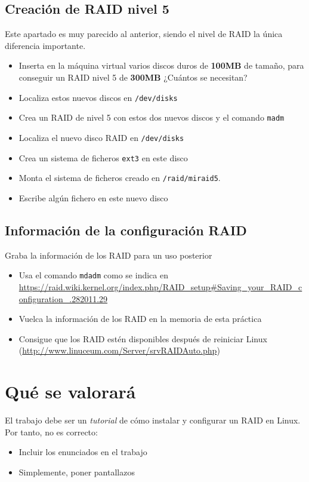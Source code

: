\subsection{Creación de RAID nivel 5}
Este apartado es muy parecido al anterior, siendo el nivel de RAID la única diferencia importante.
\begin{itemize}
\item Inserta en la máquina virtual varios discos duros de \textbf{100MB} de tamaño, para conseguir un RAID nivel 5 de \textbf{300MB} ¿Cuántos se necesitan?
\item Localiza estos nuevos discos en \texttt{/dev/disks}
\item Crea un RAID de nivel 5 con estos dos nuevos discos y el comando \texttt{madm}
\item Localiza el nuevo disco RAID en \texttt{/dev/disks}
\item Crea un sistema de ficheros \texttt{ext3} en este disco
\item Monta el sistema de ficheros creado en \texttt{/raid/miraid5}.
\item Escribe algún fichero en este nuevo disco
\end{itemize}


\subsection{Información de la configuración RAID}
Graba la información de los RAID para un uso posterior
\begin{itemize}
\item Usa el comando \texttt{mdadm} como se indica en  \url{https://raid.wiki.kernel.org/index.php/RAID_setup#Saving_your_RAID_configuration_.282011.29}
\item Vuelca la información de los RAID en la memoria de esta práctica
\item Consigue que los RAID estén disponibles después de reiniciar Linux (\url{http://www.linuceum.com/Server/srvRAIDAuto.php})
\end{itemize}


\section{Qué se valorará}
El trabajo debe ser un \textit{tutorial} de cómo instalar y configurar un RAID en Linux. Por tanto, no es correcto:
\begin{itemize}
\item Incluir los enunciados en el trabajo
\item Simplemente, poner pantallazos
\end{itemize}


